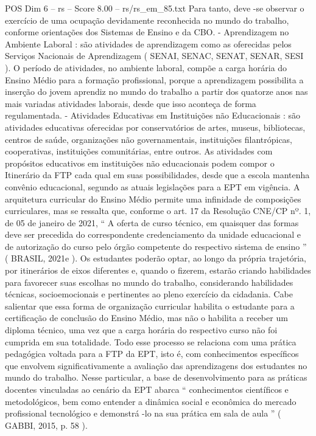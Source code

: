 \begin{textsample}{POS Dim 6 – rs – Score 8.00 – rs/rs\_em\_85.txt}
Para tanto, deve -se observar o exercício de uma ocupação devidamente reconhecida no mundo do trabalho, conforme orientações dos Sistemas de Ensino e da CBO. - Aprendizagem no Ambiente Laboral : são atividades de aprendizagem como as oferecidas pelos Serviços Nacionais de Aprendizagem ( SENAI, SENAC, SENAT, SENAR, SESI ).
O período de atividades, no ambiente laboral, compõe a carga horária do Ensino Médio para a formação profissional, porque a aprendizagem possibilita a inserção do jovem aprendiz no mundo do trabalho a partir dos quatorze anos nas mais variadas atividades laborais, desde que isso aconteça de forma regulamentada. - Atividades Educativas em Instituições não Educacionais : são atividades educativas oferecidas por conservatórios de artes, museus, bibliotecas, centros de saúde, organizações não governamentais, instituições filantrópicas, cooperativas, instituições comunitárias, entre outros.
As atividades com propósitos educativos em instituições não educacionais podem compor o Itinerário da FTP cada qual em suas possibilidades, desde que a escola mantenha convênio educacional, segundo as atuais legislações para a EPT em vigência.
A arquitetura curricular do Ensino Médio permite uma infinidade de composições curriculares, mas se ressalta que, conforme o art. 17 da Resolução CNE/CP nº. 1, de 05 de janeiro de 2021, “ A oferta de curso técnico, em quaisquer das formas deve ser precedida do correspondente credenciamento da unidade educacional e de autorização do curso pelo órgão competente do respectivo sistema de ensino ” ( BRASIL, 2021e ).
Os estudantes poderão optar, ao longo da própria trajetória, por itinerários de eixos diferentes e, quando o fizerem, estarão criando habilidades para favorecer suas escolhas no mundo do trabalho, considerando habilidades técnicas, socioemocionais e pertinentes ao pleno exercício da cidadania.
Cabe salientar que essa forma de organização curricular habilita o estudante para a certificação de conclusão do Ensino Médio, mas não o habilita a receber um diploma técnico, uma vez que a carga horária do respectivo curso não foi cumprida em sua totalidade.
Todo esse processo se relaciona com uma prática pedagógica voltada para a FTP da EPT, isto é, com conhecimentos específicos que envolvem significativamente a avaliação das aprendizagens dos estudantes no mundo do trabalho.
Nesse particular, a base de desenvolvimento para as práticas docentes vinculadas ao cenário da EPT abarca “ conhecimentos científicos e metodológicos, bem como entender a dinâmica social e econômica do mercado profissional tecnológico e demonstrá -lo na sua prática em sala de aula ” ( GABBI, 2015, p. 58 ).

\end{textsample}
